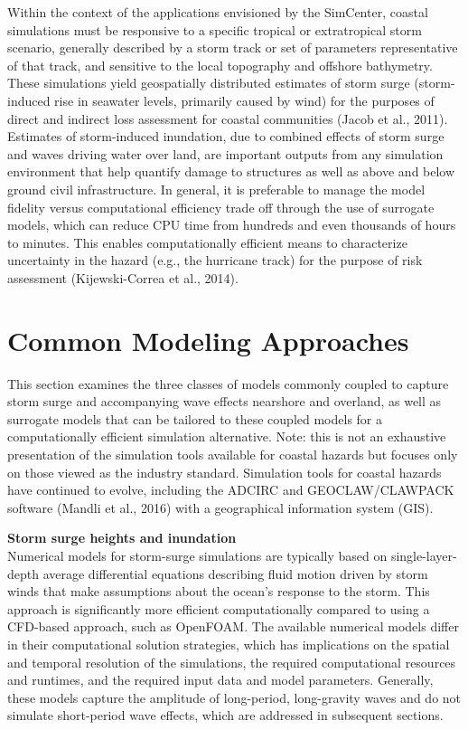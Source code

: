 Within the context of the applications envisioned by the SimCenter, coastal simulations must be responsive to a specific tropical or extratropical storm scenario, generally described by a storm track or set of parameters representative of that track, and sensitive to the local topography and offshore bathymetry. These simulations yield geospatially distributed estimates of storm surge (storm-induced rise in seawater levels, primarily caused by wind) for the purposes of direct and indirect loss assessment for coastal communities (Jacob et al., 2011). Estimates of storm-induced inundation, due to combined effects of storm surge and waves driving water over land, are important outputs from any simulation environment that help quantify damage to structures as well as above and below ground civil infrastructure.
In general, it is preferable to manage the model fidelity versus computational efficiency trade off through the use of surrogate models, which can reduce CPU time from hundreds and even thousands of hours to minutes. This enables computationally efficient means to characterize uncertainty in the hazard (e.g., the hurricane track) for the purpose of risk assessment (Kijewski-Correa et al., 2014).

\section{Common Modeling Approaches}
\label{sec:storm_surge_methods}

This section examines the three classes of models commonly coupled to capture storm surge and accompanying wave effects nearshore and overland, as well as surrogate models that can be tailored to these coupled models for a computationally efficient simulation alternative. Note: this is not an exhaustive presentation of the simulation tools available for coastal hazards but focuses only on those viewed as the industry standard. Simulation tools for coastal hazards have continued to evolve, including the ADCIRC \citep{adcirc_web} and GEOCLAW/CLAWPACK software (Mandli et al., 2016) with a geographical information system (GIS).
\newline

\noindent\textbf{Storm surge heights and inundation} \\Numerical models for storm-surge simulations are typically based on single-layer-depth average differential equations describing fluid motion driven by storm winds that make assumptions about the ocean’s response to the storm. This approach is significantly more efficient computationally compared to using a CFD-based approach, such as OpenFOAM. The available numerical models differ in their computational solution strategies, which has implications on the spatial and temporal resolution of the simulations, the required computational resources and runtimes, and the required input data and model parameters. Generally, these models capture the amplitude of long-period, long-gravity waves and do not simulate short-period wave effects, which are addressed in subsequent sections.

